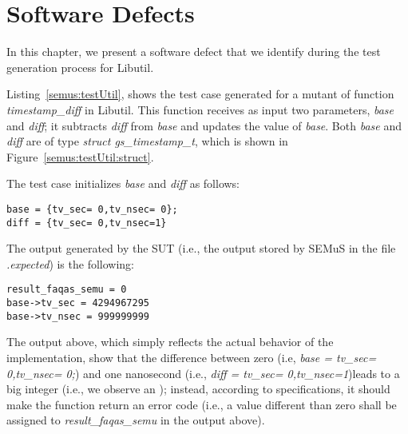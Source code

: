 
\chapter{Software Defects}

In this chapter, we present a software defect that we identify during the test generation process for Libutil.

Listing~\ref{semus:testUtil}, shows the test case generated for a mutant of function \emph{timestamp\_diff} in Libutil.
This function receives as input two parameters, \emph{base} and \emph{diff}; it subtracts \emph{diff} from \emph{base} and updates the value of \emph{base}. Both \emph{base} and \emph{diff} are of type \emph{struct gs\_timestamp\_t}, which is shown in Figure~\ref{semus:testUtil:struct}.


The test case initializes \emph{base} and \emph{diff} as follows:
\begin{verbatim}
base = {tv_sec= 0,tv_nsec= 0};
diff = {tv_sec= 0,tv_nsec=1}
\end{verbatim}

The output generated by the SUT (i.e., the output stored by SEMuS in the file \emph{.expected}) is the following:
\begin{verbatim}
result_faqas_semu = 0
base->tv_sec = 4294967295
base->tv_nsec = 999999999
\end{verbatim}

The output above, which simply reflects the actual behavior of the implementation, show that the difference between zero (i.e, \emph{base = {tv\_sec= 0,tv\_nsec= 0};}) and one nanosecond  (i.e., \emph{diff = {tv\_sec= 0,tv\_nsec=1}})leads to a big integer (i.e., we observe an ); instead, according to specifications, it should make the function return an error code (i.e., a value different than zero shall be assigned to \emph{result\_faqas\_semu} in the output above).


